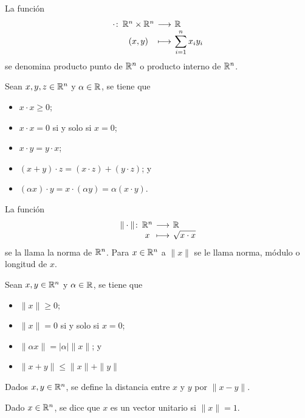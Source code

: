 \documentclass[a4,11pt]{aleph-notas}
\begin{document}
\begin{defi}
    La función 
    \[
        \funcion{\cdot}{\R^n\times \R^n}{\R}
        {(x,y)}{\sum_{i=1}^n x_iy_i}
    \]
    se denomina producto punto de $\mathbb{R}^n$ o producto interno de $\mathbb{R}^n$.
\end{defi}

\begin{teo}
    Sean $x,y,z\in \mathbb{R}^n$ y $\alpha\in\mathbb{R}$, se tiene que
    \begin{itemize}
    \item
        $x\cdot x \geq 0$;
    \item
        $x\cdot x = 0$ si y solo si $x=0$;
    \item
        $x \cdot y = y \cdot x$;
    \item 
        $(x + y)\cdot z = (x\cdot z) + (y\cdot z)$; y
    \item
        $(\alpha x)\cdot y = x\cdot(\alpha y) = \alpha(x\cdot y)$.
    \end{itemize}
\end{teo}

\begin{defi}[Norma]
    La función
    \[
        \funcion{\|\cdot\|}{\R^n}{\R}
        {x}{\sqrt{x\cdot x}}
    \]
   se la llama la norma de $\mathbb{R}^n$. Para $x\in\mathbb{R}^n$ a $\|x\|$ se le llama norma, módulo o longitud de $x$.
\end{defi}


\begin{teo}
    Sean $x,y\in \mathbb{R}^n$ y $\alpha\in\mathbb{R}$, se tiene que
    \begin{itemize}
    \item
        $\|x\| \geq 0$;
    \item
        $\|x\| = 0$ si y solo si $x=0$;
    \item 
        $\|\alpha x\| = |\alpha|\|x\|$; y
    \item
        $\|x + y\| \leq \|x\|+\|y\|$
    \end{itemize}
\end{teo}

\begin{advertencia}
    Dados $x,y\in\mathbb{R}^n$, se define la distancia entre $x$ y $y$ por $\|x-y\|$.
\end{advertencia}

\begin{defi}
    Dado $x\in\mathbb{R}^n$, se dice que $x$ es un vector unitario si $\|x\|=1$.
\end{defi}
\end{document}
